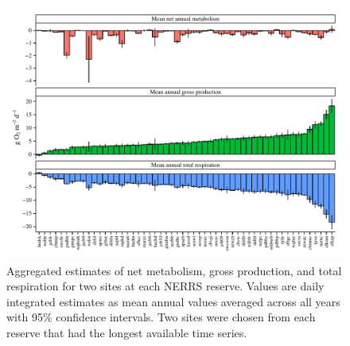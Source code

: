 \documentclass[10pt,letterpaper]{article}\usepackage[]{graphicx}\usepackage[]{color}
\makeatletter
\def\maxwidth{ %
  \ifdim\Gin@nat@width>\linewidth
    \linewidth
  \else
    \Gin@nat@width
  \fi
}
\newenvironment{knitrout}{}{} %
\makeatother
\begin{document}
\begin{knitrout}
\color{fgcolor}\begin{figure}[!ht]


{\centering \includegraphics[width=\maxwidth]{figure/metab_plo} 

}

\caption[Aggregated estimates of net metabolism, gross production, and total respiration for two sites at each \ac{NERRS} reserve]{Aggregated estimates of net metabolism, gross production, and total respiration for two sites at each \ac{NERRS} reserve.  Values are daily integrated estimates as mean annual values averaged across all years with 95\% confidence intervals.  Two sites were chosen from each reserve that had the longest available time series.\label{fig:metab_plo}}
\end{figure}


\end{knitrout}

\end{document}
